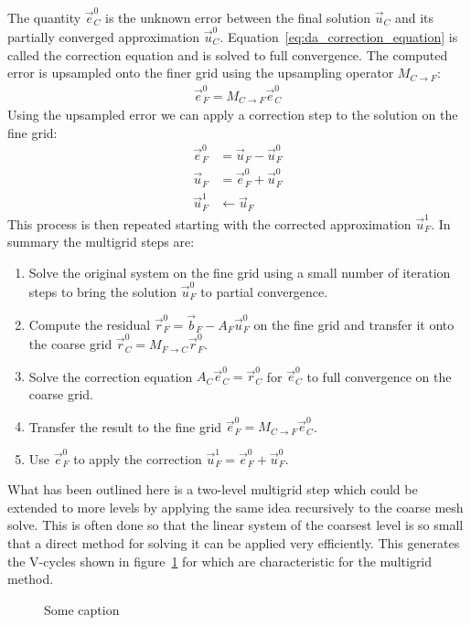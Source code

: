 The quantity $\vec{e}_C^0$ is the unknown error between the final solution $\vec{u}_C$ and its partially converged approximation $\vec{u}_C^0$. Equation~\ref{eq:da_correction_equation} is called the correction equation and is solved to full convergence. The computed error is upsampled onto the finer grid using the upsampling operator $M_{C\rightarrow F}$:
\begin{align}
\vec{e}_F^0 = M_{C\rightarrow F}\vec{e}_C^0
\nonumber
\end{align}
Using the upsampled error we can apply a correction step to the solution on the fine grid:
\begin{align}
\vec{e}_F^0 &= \vec{u}_F - \vec{u}_F^0
\nonumber
\\
\vec{u}_F &=  \vec{e}_F^0 + \vec{u}_F^0
\nonumber
\\
\vec{u}_F^1  &\leftarrow \vec{u}_F
\nonumber
\end{align}
This process is then repeated starting with the corrected approximation $\vec{u}_F^1$. In summary the multigrid steps are:
\begin{enumerate}
\item Solve the original system on the fine grid using a small number of iteration steps to bring the solution $\vec{u}_F^0$ to partial convergence.
\item Compute the residual $\vec{r}_F^0=\vec{b}_F - A_F\vec{u}_F^0$ on the fine grid and transfer it onto the coarse grid $\vec{r}_C^0 = M_{F\rightarrow C}\vec{r}_F^0$.
\item Solve the correction equation $A_C\vec{e}_C^0 = \vec{r}_C^0$ for $\vec{e}_C^0$ to full convergence on the coarse grid.
\item Transfer the result to the fine grid $\vec{e}_F^0 = M_{C\rightarrow F}\vec{e}_C^0$.
\item Use $\vec{e}_F^0$ to apply the correction $\vec{u}_F^1 =  \vec{e}_F^0 + \vec{u}_F^0$.
\end{enumerate}
What has been outlined here is a two-level multigrid step which could be extended to more levels by applying the same idea recursively to the coarse mesh solve. This is often done so that the linear system of the coarsest level is so small that a direct method for solving it can be applied very efficiently. This generates the V-cycles shown in figure~\ref{fig:da_solver_multigrid_vcycles} for which are characteristic for the multigrid method.
\begin{figure}[h]
\centering
{}
\caption{Some caption}
\label{fig:da_solver_multigrid_vcycles}
\end{figure}






